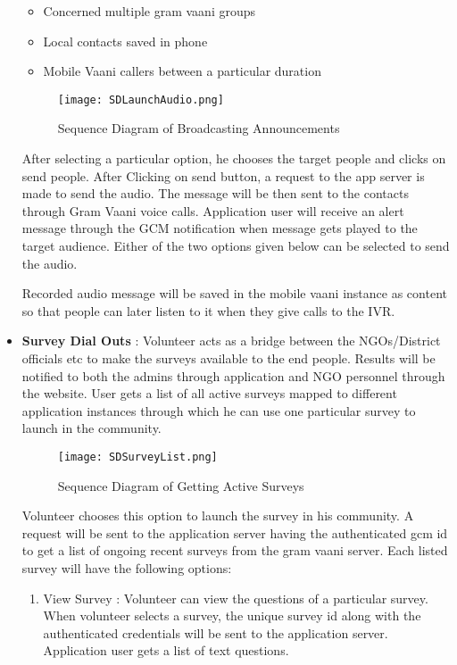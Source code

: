 \begin{itemize}
\begin{itemize}
	\item Concerned multiple gram vaani groups 
	\item Local contacts saved in phone 
	\item Mobile Vaani callers between a  particular duration
\end{itemize}

\begin{figure}[H]
    \centering
	\texttt{[image: SDLaunchAudio.png]}
    \caption{ Sequence Diagram of Broadcasting Announcements }
    \label{fig:Sequence Diagram of Broadcasting Announcements}
\end{figure}


After selecting a particular option, he chooses the target people and clicks on send people. After Clicking on send button, a request to the app server is made to send the audio. The message will be then sent to the contacts through Gram Vaani voice calls. Application user will receive an alert  message through the GCM notification when message gets played to the target audience. Either of the two options given below can be selected to send the audio.

Recorded audio message will be saved in the mobile vaani instance as content so that people can later listen to it when they give calls to the IVR.

\item \textbf{Survey Dial Outs} : Volunteer acts as a bridge between the NGOs/District officials etc to make the surveys available to the end people. Results will be notified to both the admins through application and NGO personnel through the website. User gets a list of all active surveys mapped to different application instances through which he can use one particular survey to launch in the community.

\begin{figure}[H]
    \centering
	\texttt{[image: SDSurveyList.png]}
    \caption{ Sequence Diagram of Getting Active Surveys}
    \label{fig:Sequence Diagram of Getting Active Surveys}
\end{figure}


Volunteer  chooses this option to launch the survey in his community. A request will be sent to the application server having the authenticated gcm id to get a list of ongoing recent surveys from the gram vaani server. Each listed survey will have the following options:
	\begin{enumerate}
	\item{ View Survey} : Volunteer can view the questions of a particular survey. When volunteer selects a survey, the unique survey id along with the authenticated credentials will be sent to the application server.  Application user gets a list of text questions.
	

\end{enumerate}
\end{itemize}

